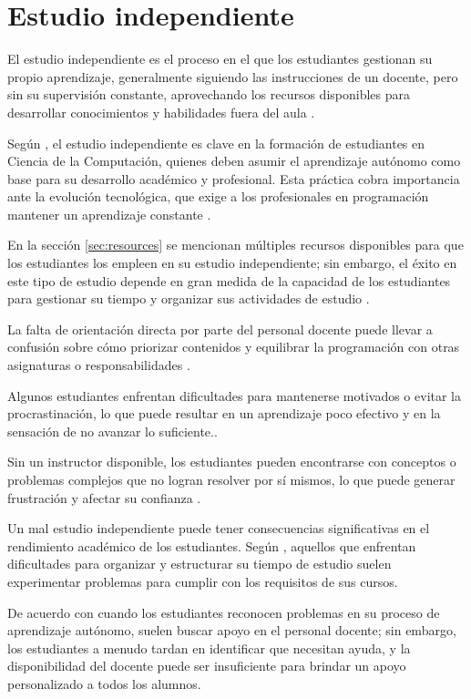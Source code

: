 \documentclass{article}
\begin{document}
\section{Estudio independiente}

El estudio independiente es el proceso en el que los estudiantes gestionan su propio aprendizaje, generalmente siguiendo las instrucciones de un docente, pero sin su supervisión constante, aprovechando los recursos disponibles para desarrollar conocimientos y habilidades fuera del aula \cite{proskuraLytvynova2020}.

Según \cite{proskuraLytvynova2020}, el estudio independiente es clave en la formación de estudiantes en Ciencia de la Computación, quienes deben asumir el aprendizaje autónomo como base para su desarrollo académico y profesional. Esta práctica cobra importancia ante la evolución tecnológica, que exige a los profesionales en programación mantener un aprendizaje constante \cite{proskuraLytvynova2020}.

En la sección \ref{sec:resources} se mencionan múltiples recursos disponibles para que los estudiantes los empleen en su estudio independiente; sin embargo, el éxito en este tipo de estudio depende en gran medida de la capacidad de los estudiantes para gestionar su tiempo y organizar sus actividades de estudio \cite{overklift2019}.

La falta de orientación directa por parte del personal docente puede llevar a confusión sobre cómo priorizar contenidos y equilibrar la programación con otras asignaturas o responsabilidades \cite{proskuraLytvynova2020}. 

Algunos estudiantes enfrentan dificultades para mantenerse motivados o evitar la procrastinación, lo que puede resultar en un aprendizaje poco efectivo y en la sensación de no avanzar lo suficiente.\cite{coto02012022}. 

Sin un instructor disponible, los estudiantes pueden encontrarse con conceptos o problemas complejos que no logran resolver por sí mismos, lo que puede generar frustración y afectar su confianza \cite{overklift2019}.

Un mal estudio independiente puede tener consecuencias significativas en el rendimiento académico de los estudiantes. Según \cite{overklift2019}, aquellos que enfrentan dificultades para organizar y estructurar su tiempo de estudio suelen experimentar problemas para cumplir con los requisitos de sus cursos.

De acuerdo con \cite{overklift2019} cuando los estudiantes reconocen problemas en su proceso de aprendizaje autónomo, suelen buscar apoyo en el personal docente; sin embargo, los estudiantes a menudo tardan en identificar que necesitan ayuda, y la disponibilidad del docente puede ser insuficiente para brindar un apoyo personalizado a todos los alumnos.
\end{document}

